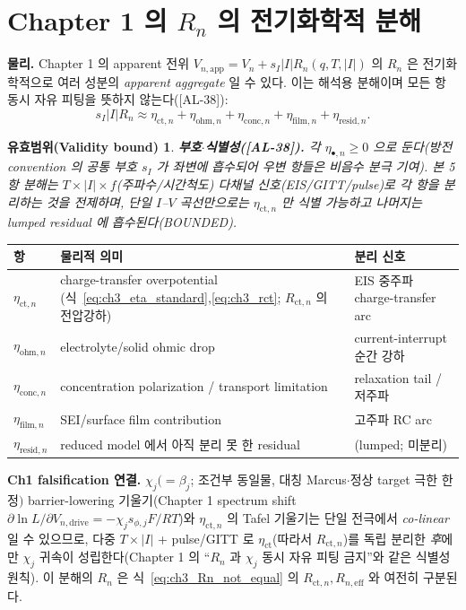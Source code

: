 \documentclass[11pt,a4paper]{article}
\newtheorem*{boundbox}{유효범위(Validity bound)}
\newcommand{\eff}{\mathrm{eff}}
\newcommand{\app}{\mathrm{app}}
\newcommand{\drive}{\mathrm{drive}}
\newcommand{\ct}{\mathrm{ct}}
\newcommand{\resid}{\mathrm{resid}}
\newcommand{\ohm}{\mathrm{ohm}}
\newcommand{\conc}{\mathrm{conc}}
\newcommand{\film}{\mathrm{film}}
\newcommand{\AL}[1]{\textsf{[AL-#1]}}
\begin{document}
\section{Chapter 1 의 $R_n$ 의 전기화학적 분해}\label{sec:ch3_Rn}
\textbf{물리.} Chapter 1 의 apparent 전위 $V_{n,\app}=V_n+s_I|I|R_n(q,T,|I|)$ 의 $R_n$ 은 전기화학적으로 여러
성분의 \emph{apparent aggregate} 일 수 있다. 이는 해석용 분해이며 모든 항 동시 자유 피팅을 뜻하지 않는다(\AL{38}):
\begin{equation}
s_I|I|R_n\approx\eta_{\ct,n}+\eta_{\ohm,n}+\eta_{\conc,n}+\eta_{\film,n}+\eta_{\resid,n}.
\label{eq:ch3_Rn_decomp}
\end{equation}
\begin{boundbox}
\textbf{부호$\cdot$식별성(\AL{38}).} 각 $\eta_{\bullet,n}\ge0$ 으로 둔다(방전 convention 의 공통 부호 $s_I$ 가
좌변에 흡수되어 우변 항들은 비음수 분극 기여). 본 5항 분해는 $T\times|I|\times f$(주파수/시간척도) 다채널
신호(EIS/GITT/pulse)로 각 항을 \emph{분리}하는 것을 전제하며, 단일 $I$--$V$ 곡선만으로는 $\eta_{\ct,n}$ 만
식별 가능하고 나머지는 lumped residual 에 흡수된다(BOUNDED).
\end{boundbox}
\begin{longtable}{p{} >{\raggedright\arraybackslash}p{} >{\raggedright\arraybackslash}p{}}
\toprule 항 & 물리적 의미 & 분리 신호 \\ \midrule \endhead
$\eta_{\ct,n}$ & charge-transfer overpotential (식~\eqref{eq:ch3_eta_standard},\allowbreak\eqref{eq:ch3_rct}; $R_{\ct,n}$ 의 전압강하) & EIS 중주파 charge-transfer arc \\
$\eta_{\ohm,n}$ & electrolyte/solid ohmic drop & current-interrupt 순간 강하 \\
$\eta_{\conc,n}$ & concentration polarization / transport limitation & relaxation tail / 저주파 \\
$\eta_{\film,n}$ & SEI/surface film contribution & 고주파 RC arc \\
$\eta_{\resid,n}$ & reduced model 에서 아직 분리 못 한 residual & (lumped; 미분리) \\
\bottomrule
\end{longtable}
\textbf{Ch1 falsification 연결.} $\chi_j(=\beta_j$; 조건부 동일물, 대칭 Marcus$\cdot$정상 target 극한 한정$)$ barrier-lowering 기울기(Chapter 1 spectrum shift
$\partial\ln L/\partial V_{n,\drive}=-\chi_j s_{\phi,j}F/RT$)와 $\eta_{\ct,n}$ 의 Tafel 기울기는 단일 전극에서
\emph{co-linear} 일 수 있으므로, 다중 $T\times|I|$ + pulse/GITT 로 $\eta_{\ct}$(따라서 $R_{\ct,n}$)를 독립
분리한 \emph{후}에만 $\chi_j$ 귀속이 성립한다(Chapter 1 의 ``$R_n$ 과 $\chi_j$ 동시 자유 피팅 금지''와 같은
식별성 원칙). 이 분해의 $R_n$ 은 식~\eqref{eq:ch3_Rn_not_equal} 의 $R_{\ct,n},R_{n,\eff}$ 와 여전히 구분된다.
\end{document}
